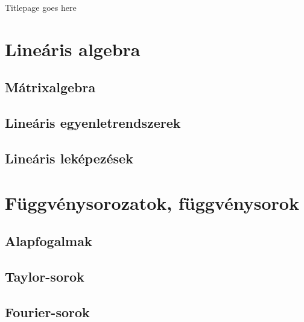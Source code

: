 \documentclass[b5paper, 10pt, twoside]{scrbook}
\begin{document}
\frontmatter

\begin{titlepage}
  Titlepage goes here
\end{titlepage}

\tableofcontents

\mainmatter

\clearpage
\chapter{Lineáris algebra}

\clearpage
\section{Mátrixalgebra}

\clearpage
\section{Lineáris egyenletrendszerek}

\clearpage
\section{Lineáris leképezések}



\clearpage
\chapter{Függvénysorozatok, függvénysorok}

\clearpage
\section{Alapfogalmak}

\clearpage
\section{Taylor-sorok}

\clearpage
\section{Fourier-sorok}
\end{document}

